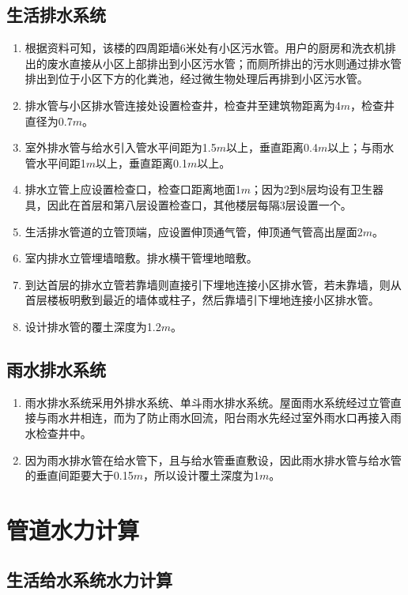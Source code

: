 \documentclass{gdutart}
\begin{document}
    \subsection{生活排水系统}
      \begin{enumerate}
        \item 根据资料可知，该楼的四周距墙6米处有小区污水管。用户的厨房和洗衣机排出的废水直接从小区上部排出到小区污水管；而厕所排出的污水则通过排水管排出到位于小区下方的化粪池，经过微生物处理后再排到小区污水管。
        \item 排水管与小区排水管连接处设置检查井，检查井至建筑物距离为4$m$，检查井直径为0.7$m$。
        \item 室外排水管与给水引入管水平间距为1.5$m$以上，垂直距离0.4$m$以上；与雨水管水平间距1$m$以上，垂直距离0.1$m$以上。
        \item 排水立管上应设置检查口，检查口距离地面1$m$；因为2到8层均设有卫生器具，因此在首层和第八层设置检查口，其他楼层每隔3层设置一个。
        \item 生活排水管道的立管顶端，应设置伸顶通气管，伸顶通气管高出屋面2$m$。
        \item 室内排水立管埋墙暗敷。排水横干管埋地暗敷。
        \item 到达首层的排水立管若靠墙则直接引下埋地连接小区排水管，若未靠墙，则从首层楼板明敷到最近的墙体或柱子，然后靠墙引下埋地连接小区排水管。
        \item 设计排水管的覆土深度为1.2$m$。
      \end{enumerate}

    \subsection{雨水排水系统}
      \begin{enumerate}
        \item 雨水排水系统采用外排水系统、单斗雨水排水系统。屋面雨水系统经过立管直接与雨水井相连，而为了防止雨水回流，阳台雨水先经过室外雨水口再接入雨水检查井中。
        \item 因为雨水排水管在给水管下，且与给水管垂直敷设，因此雨水排水管与给水管的垂直间距要大于0.15$m$，所以设计覆土深度为1$m$。
      \end{enumerate} \newpage

  \section{管道水力计算}
    \subsection{生活给水系统水力计算}
\end{document}
